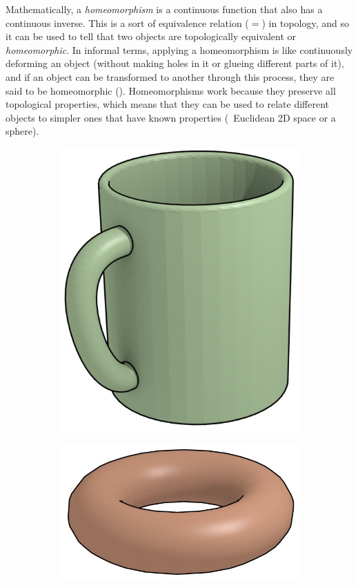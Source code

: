Mathematically, a \emph{homeomorphism} is a continuous function that also has a continuous inverse.
This is a sort of equivalence relation (\(=\)) in topology, and so it can be used to tell that two objects are topologically equivalent or \emph{homeomorphic}.
In informal terms, applying a homeomorphism is like continuously deforming an object (without making holes in it or glueing different parts of it), and if an object can be transformed to another through this process, they are said to be homeomorphic ().
Homeomorphisms work because they preserve all topological properties, which means that they can be used to relate different objects to simpler ones that have known properties (\eg\ Euclidean 2D space or a sphere).

\begin{figure}
\centering
\begin{subfigure}[b]{0.3\linewidth}
\includegraphics[width=\linewidth]{figs/mug}
\caption{}%
\label{subfig:mug}
\end{subfigure}
\quad
\begin{subfigure}[b]{0.3\linewidth}
\includegraphics[width=\linewidth]{figs/donut}

\end{subfigure}
\end{figure}
